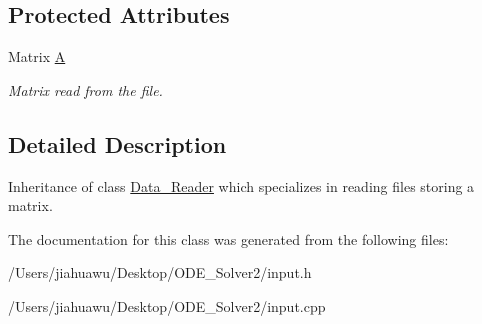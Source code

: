 \subsection*{Protected Attributes}
\begin{DoxyCompactItemize}
\item 
\mbox{\label{class_matrix___reader_a4a8f9b95e6361b1a58a53a3e54c0b0bb}} 
Matrix \mbox{\hyperlink{class_matrix___reader_a4a8f9b95e6361b1a58a53a3e54c0b0bb}{A}}
\begin{DoxyCompactList}\small\item\em Matrix read from the file. \end{DoxyCompactList}\end{DoxyCompactItemize}


\subsection{Detailed Description}
Inheritance of class \mbox{\hyperlink{class_data___reader}{Data\+\_\+\+Reader}} which specializes in reading files storing a matrix. 

The documentation for this class was generated from the following files\+:\begin{DoxyCompactItemize}
\item 
/\+Users/jiahuawu/\+Desktop/\+O\+D\+E\+\_\+\+Solver2/input.\+h\item 
/\+Users/jiahuawu/\+Desktop/\+O\+D\+E\+\_\+\+Solver2/input.\+cpp\end{DoxyCompactItemize}
